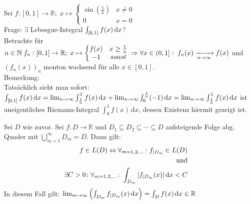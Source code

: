 Sei $f\colon [0,1]\to\mathbb{R};\; x\mapsto\left\{\begin{matrix}
    \sin\left(\frac{1}{x}\right)& x\neq 0\\
    0 & x = 0
\end{matrix}\right.$\\
Frage: $\exists$ Lebesgue-Integral $\int_{[0,1]} f(x) \,\text{d}x$?\\
Betrachte für $n\in\mathbb{N}\; f_n:[0,1]\to\mathbb{R};\;x\mapsto\left\{\begin{matrix}
    f(x) & x\geq \frac{1}{n}\\
    -1 & sonst
\end{matrix}\right.\\\Rightarrow \forall x\in (0,1]:\;f_n(x)\xrightarrow[n\to\infty]{}f(x)$ und $(f_n(x))_n$ monton wachsend für alle $x\in [0,1]$.\\
Bemerkung:\\
Tatsächlich sieht man sofort:
$\int_{[0,1]} f(x) \,\text{d}x = \lim_{n\to\infty}\int_{\frac{1}{n}}^1f(x)\,\text{d}x + \lim_{n\to\infty} \int_0^{\frac{1}{n}}(-1)\,\text{d}x = \lim_{n\to\infty} \int_{\frac{1}{n}}^1f(x)\,\text{d}x$
ist uneigentliches Riemann-Integral $\int_0^1f(x)\,\text{d}x$, dessen Existenz hiermit gezeigt ist.

\begin{korollar}
    Sei $D$ wie zuvor. Sei $f\colon D\to\mathbb{R}$ und $D_1\subseteq D_2\subseteq\cdots\subseteq D$ aufsteigende Folge abg. Quader mit $\bigcup_{m=1}^\infty D_m = D$. Dann gilt:
    \begin{align*}
        f \in L(D) \Leftrightarrow \forall_{m=1,2,\dots} \colon f_{|D_m} \in L(D)\\
        \text{und}\\
        \exists C > 0\colon \forall_{m=1,2,\dots}\colon\int_{{D_m}} |{f_{|D_m}(x)}| \,\text{d}x < C\\
    \end{align*}
    In diesem Fall gilt: $\lim_{m \to \infty}\left(\int_{{D_m}} {f_{|D_m}}(x) \,\text{d}x\right) = \int_{D} f(x) \,\text{d}x \in \mathbb{R}$
\end{korollar}